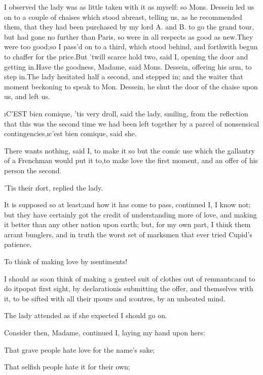 \documentclass[twoside]{article}
\begin{document}
I observed the lady was as little taken with it as myself: so Mons.
Dessein led us on to a couple of chaises which stood abreast, telling us,
as he recommended them, that they had been purchased by my lord A. and B.
to go the grand tour, but had gone no further than Paris, so were in all
respects as good as new.\tsk They were too good;\tsk so I pass’d on to a third,
which stood behind, and forthwith begun to chaffer for the price.\tsk But
’twill scarce hold two, said I, opening the door and getting in.\tsk Have the
goodness, Madame, said Mons. Dessein, offering his arm, to step in.\tsk The
lady hesitated half a second, and stepped in; and the waiter that moment
beckoning to speak to Mon. Dessein, he shut the door of the chaise upon
us, and left us.






\i{C’EST bien comique}, ’tis very droll, said the lady, smiling, from the
reflection that this was the second time we had been left together by a
parcel of nonsensical contingencies,\tsk \i{c’est bien comique}, said she.\tsk 

\tsk There wants nothing, said I, to make it so but the comic use which the
gallantry of a Frenchman would put it to,\tsk to make love the first moment,
and an offer of his person the second.

’Tis their \i{fort}, replied the lady.

It is supposed so at least;\tsk and how it has come to pass, continued I, I
know not; but they have certainly got the credit of understanding more of
love, and making it better than any other nation upon earth; but, for my
own part, I think them arrant bunglers, and in truth the worst set of
marksmen that ever tried Cupid’s patience.

\tsk To think of making love by \i{sentiments}!

I should as soon think of making a genteel suit of clothes out of
remnants:\tsk and to do it\tsk pop\tsk at first sight, by declaration\tsk is submitting
the offer, and themselves with it, to be sifted with all their \i{pours}
and \i{contres}, by an unheated mind.

The lady attended as if she expected I should go on.

Consider then, Madame, continued I, laying my hand upon hers:\tsk 

That grave people hate love for the name’s sake;\tsk 

That selfish people hate it for their own;\tsk 
\end{document}
